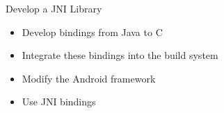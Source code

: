 \setuplabframe
{Develop a JNI Library}
{
  \begin{itemize}
  \item Develop bindings from Java to C
  \item Integrate these bindings into the build system
  \item Modify the Android framework
  \item Use JNI bindings
  \end{itemize}
}
